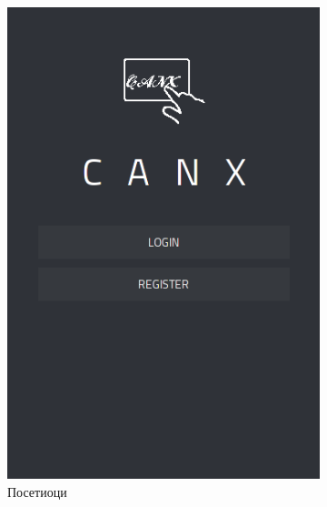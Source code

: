 \documentclass[a4paper]{article}
\begin{document}
\begin{figure}
\centering
\begin{subfigure}{.5\textwidth}
  \centering
  \includegraphics[width=.9\linewidth]{home_noauth}
  \caption{Посетиоци}
  \label{fig:sub1}
\end{subfigure}%
\begin{subfigure}{.5\textwidth}
  \centering

\end{subfigure}
\end{figure}
\end{document}
